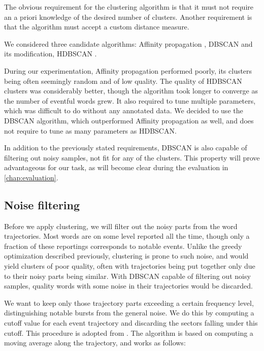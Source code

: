 The obvious requirement for the clustering algorithm is that it must not require an a priori knowledge of the desired number of clusters. Another requirement is that the algorithm must accept a custom distance measure.

We considered three candidate algorithms: Affinity propagation \citep{affinity-propagation}, DBSCAN \citep{dbscan} and its modification, HDBSCAN \citep{hdbscan}.

During our experimentation, Affinity propagation performed poorly, its clusters being often seemingly random and of low quality. The quality of HDBSCAN clusters was considerably better, though the algorithm took longer to converge as the number of eventful words grew. It also required to tune multiple parameters, which was difficult to do without any annotated data. We decided to use the DBSCAN algorithm, which outperformed Affinity propagation as well, and does not require to tune as many parameters as HDBSCAN.

In addition to the previously stated requirements, DBSCAN is also capable of filtering out noisy samples, not fit for any of the clusters. This property will prove advantageous for our task, as will become clear during the evaluation in \autoref{chap:evaluation}.


\subsection{Noise filtering}
Before we apply clustering, we will filter out the noisy parts from the word trajectories. Most words are on some level reported all the time, though only a fraction of these reportings corresponds to notable events. Unlike the greedy optimization described previously, clustering is prone to such noise, and would yield clusters of poor quality, often with trajectories being put together only due to their noisy parts being similar. With DBSCAN capable of filtering out noisy samples, quality words with some noise in their trajectories would be discarded.

We want to keep only those trajectory parts exceeding a certain frequency level, distinguishing notable bursts from the general noise. We do this by computing a cutoff value for each event trajectory and discarding the sectors falling under this cutoff. This procedure is adopted from \cite{online-search-queries}. The algorithm is based on computing a moving average along the trajectory, and works as follows:

